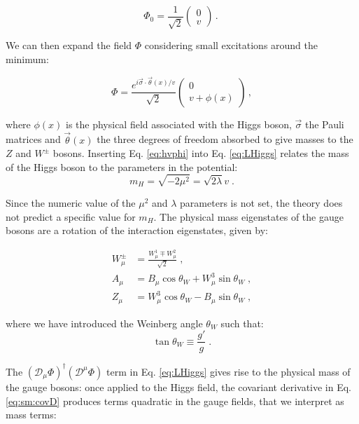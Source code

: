 \begin{equation}
	\Phi_0 = \frac{1}{\sqrt{2}} \left( \begin{array}{c} 0 \\ v  \end{array} \right) \, . \
\label{eq:hvphi}
\end{equation}

We can then expand the field $\Phi$ considering small excitations around the minimum:

\begin{equation}
	\Phi = \frac{e^{i \vec{\sigma} \cdot \vec{\theta}(x)/v }}{\sqrt{2}} \left( \begin{array}{c} 0 \\ v + \phi(x) \end{array} \right) \, ,
\label{eq:hvphi}
\end{equation}

\noindent where $\phi(x)$ is the physical field associated with the Higgs boson, $\vec{\sigma}$ the Pauli matrices and $\vec{\theta}(x)$ the three degrees of freedom absorbed to give masses to the $Z$ and $W^\pm$ bosons. Inserting Eq. \ref{eq:hvphi} into Eq. \ref{eq:LHiggs} relates the mass of the Higgs boson to the parameters in the potential:
\begin{equation}
m_H = \sqrt{- 2 \mu^2} = \sqrt{2 \lambda} v \; .
\label{eq:sm:Higgsmass}
\end{equation}

Since the numeric value of the $\mu^2$ and $\lambda$ parameters is not set, the theory does not predict a specific value for $m_H$. 
The physical mass eigenstates of the gauge bosons are a rotation of the interaction eigenstates, given by:

\begin{equation}
\begin{aligned}
W_\mu^\pm &= \frac{W_\mu^1 \mp W_\mu^2}{\sqrt{2}} \; , \\
A_\mu &= B_\mu \cos\theta_W + W^3_\mu \sin\theta_W \; ,  \\
Z_\mu &= W^3_\mu \cos\theta_W - B_\mu \sin\theta_W \; ,
\end{aligned}
\label{eq:wein}
\end{equation}

\noindent where we have introduced the Weinberg angle $\theta_W$ such that:
\begin{equation}
\tan\theta_W \equiv \frac{g'}{g} \; .
\end{equation}


The $(\mathcal{D}_{\mu} \Phi)^{\dagger} (\mathcal{D}^{\mu} \Phi)$ term in Eq. \ref{eq:LHiggs} gives rise to the physical mass of the gauge bosons: once applied to the Higgs field, the covariant derivative in Eq. \ref{eq:sm:covD} produces terms quadratic in the gauge fields, that we interpret as mass terms:

